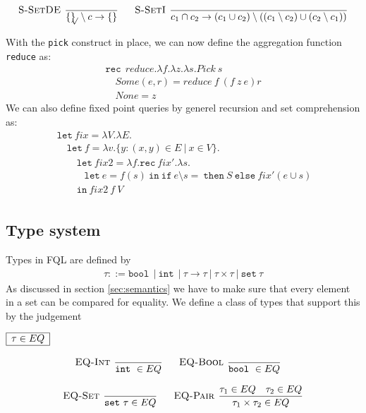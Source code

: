 \documentclass[a4paper]{article}
\newcommand{\code}[1]{{\tt #1}}
\newcommand{\pipe}{\ | \ }
\newcommand{\s}[1]{\mathtt{#1}}
\newcommand{\sLb}{\s{\{}}
\newcommand{\sRb}{\s{\}}}
\newcommand{\sbool}{\s{bool\ }}
\newcommand{\sint}{\s{int\ }}
\newcommand{\sseta}{\s{set\ }}
\newcommand{\sif}{\s{if\ }}
\newcommand{\sthen}{\s{\ then\ }}
\newcommand{\selse}{\s{\ else\ }}
\newcommand{\slet}{\s{\ let\ }}
\newcommand{\sletin}[2]{\s{let\ } #1 \s{\ in\ } #2}
\newcommand{\srec}{\s{rec\ }}
\newcommand{\strue}{\s{true}}
\newcommand{\sfalse}{\s{false}}
\newcommand{\sset}[1]{\sLb #1 \sRb}
\newcommand{\ssetc}[1]{\sset{#1}_{\!\!\!\surd}}
\newcommand{\step}{\to}
\newcommand{\dotset}[2]{\{#1,\ldots,#2\}}
\renewcommand{\rule}[3][]{\ \mbox{\textsc{#1 }}\dfrac{#2}{#3}\ }
\newcommand{\smbox}[1]{
  $\begin{array}{|c|}
    \hline
    #1 \\
    \hline
  \end{array}$
}
\begin{document}
\[\begin{array}{c}
{}
\quad\\\\
\rule[S-SetDE]{}{\ssetc{} \setminus c \step \sset{}}
\quad
\rule[S-SetI]{}{c_1 \cap c_2 \step (c_1 \cup c_2) \setminus ((c_1 \setminus c_2) \cup (c_2 \setminus c_1))}
\end{array}\]


With the \code{pick} construct in place, we can now define the aggregation function \code{reduce} as:
\[\begin{array}{l}
\srec \  reduce.\lambda f.\lambda z.\lambda s.Pick \ s \\
\quad Some (e,r) = reduce \ f \ (f \  z \  e) r\\
\quad None = z
\end{array}\]
We can also define fixed point queries by generel recursion and set comprehension as:
\[\begin{array}{l}
\slet fix = \lambda V.\lambda E. \\
\quad \slet f = \lambda v.\sLb y : (x,y) \in E \pipe x\in V \sRb . \\
\quad\quad \slet fix2 = \lambda f.\srec fix'.\lambda s. \\
\quad\quad\quad \sletin{e = f(s)}{\sif e \setminus s = {} \sthen S \selse fix' (e \cup s)} \\
\ \quad\quad \s{in\ } fix2\  f\  V \\
\end{array}\]

\subsection{Type system}
Types in FQL are defined by
\begin{eqnarray*}
\tau ::= \sbool \pipe \sint \pipe \tau \to \tau \pipe \tau \times \tau \pipe \sseta \tau
\end{eqnarray*}
As discussed in section \ref{sec:semantics} we have to make sure
that every element in a set can be compared for equality. We define
a class of types that support this by the judgement
\smbox{\tau \in EQ}
\[\begin{array}{c}
\rule[EQ-Int]{}{\sint \in EQ}\quad
\rule[EQ-Bool]{}{\sbool \in EQ}\quad\\\\
\rule[EQ-Set]{}{\sseta \tau \in EQ}\quad
\rule[EQ-Pair]{\tau_1 \in EQ \quad \tau_2 \in EQ}{\tau_1 \times \tau_2 \in EQ}
\end{array}\]
\end{document}

